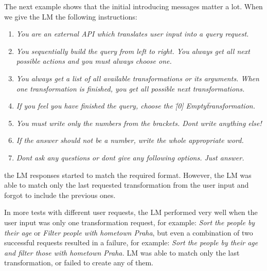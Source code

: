 \documentclass[11pt]{article}
\begin{document}
\pagebreak

The next example shows that the initial introducing messages matter a lot. When we give the LM the following instructions:
\begin{enumerate}
    \item \textit{You are an external API which translates user input into a query request.}
    \item \textit{You sequentially build the query from left to right. You always get all next possible actions and you must always choose one.}
    \item \textit{You always get a list of all available transformations or its arguments. When one transformation is finished, you get all possible next transformations.}
    \item \textit{If you feel you have finished the query, choose the \"[0] Empty\" transformation.}
    \item \textit{You must write only the numbers from the brackets. Dont write anything else!}
    \item \textit{If the answer should not be a number, write the whole appropriate word.}
    \item \textit{Dont ask any questions or dont give any following options. Just answer.}
\end{enumerate}
the LM responses started to match the required format. However, the LM was able to match only the last requested transformation from the user input and forgot to include the previous ones.

In more tests with different user requests, the LM performed very well when the user input was only one transformation request, for example: \textit{Sort the people by their age} or \textit{Filter people with hometown Praha}, but even a combination of two successful requests resulted in a failure, for example: \textit{Sort the people by their age and filter those with hometown Praha.} LM was able to match only the last transformation, or failed to create any of them. 
\end{document}

